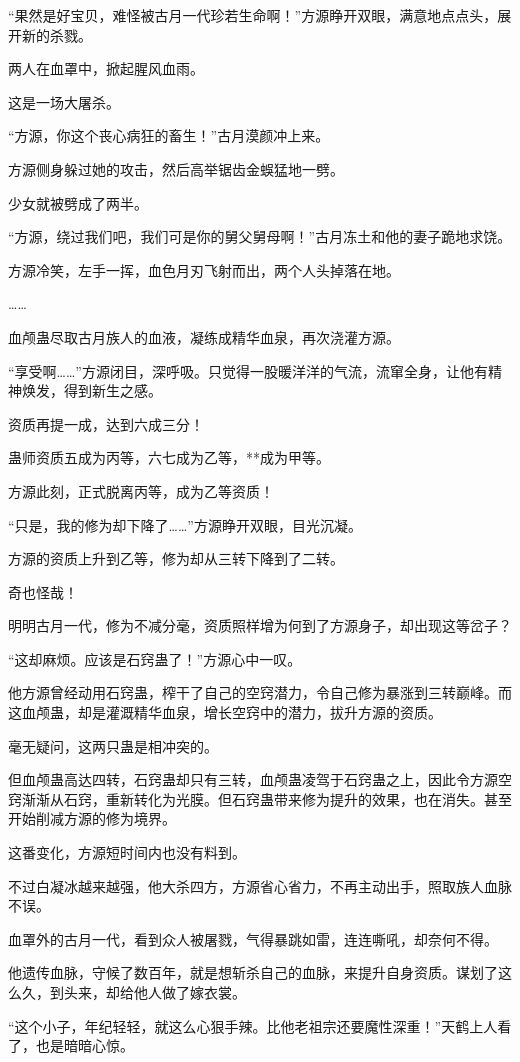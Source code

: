 \begin{this_body}
“果然是好宝贝，难怪被古月一代珍若生命啊！”方源睁开双眼，满意地点点头，展开新的杀戮。

两人在血罩中，掀起腥风血雨。

这是一场大屠杀。

“方源，你这个丧心病狂的畜生！”古月漠颜冲上来。

方源侧身躲过她的攻击，然后高举锯齿金蜈猛地一劈。

少女就被劈成了两半。

“方源，绕过我们吧，我们可是你的舅父舅母啊！”古月冻土和他的妻子跪地求饶。

方源冷笑，左手一挥，血色月刃飞射而出，两个人头掉落在地。

……

血颅蛊尽取古月族人的血液，凝练成精华血泉，再次浇灌方源。

“享受啊……”方源闭目，深呼吸。只觉得一股暖洋洋的气流，流窜全身，让他有精神焕发，得到新生之感。

资质再提一成，达到六成三分！

蛊师资质五成为丙等，六七成为乙等，**成为甲等。

方源此刻，正式脱离丙等，成为乙等资质！

“只是，我的修为却下降了……”方源睁开双眼，目光沉凝。

方源的资质上升到乙等，修为却从三转下降到了二转。

奇也怪哉！

明明古月一代，修为不减分毫，资质照样增为何到了方源身子，却出现这等岔子？

“这却麻烦。应该是石窍蛊了！”方源心中一叹。

他方源曾经动用石窍蛊，榨干了自己的空窍潜力，令自己修为暴涨到三转巅峰。而这血颅蛊，却是灌溉精华血泉，增长空窍中的潜力，拔升方源的资质。

毫无疑问，这两只蛊是相冲突的。

但血颅蛊高达四转，石窍蛊却只有三转，血颅蛊凌驾于石窍蛊之上，因此令方源空窍渐渐从石窍，重新转化为光膜。但石窍蛊带来修为提升的效果，也在消失。甚至开始削减方源的修为境界。

这番变化，方源短时间内也没有料到。

不过白凝冰越来越强，他大杀四方，方源省心省力，不再主动出手，照取族人血脉不误。

血罩外的古月一代，看到众人被屠戮，气得暴跳如雷，连连嘶吼，却奈何不得。

他遗传血脉，守候了数百年，就是想斩杀自己的血脉，来提升自身资质。谋划了这么久，到头来，却给他人做了嫁衣裳。

“这个小子，年纪轻轻，就这么心狠手辣。比他老祖宗还要魔性深重！”天鹤上人看了，也是暗暗心惊。


\end{this_body}
